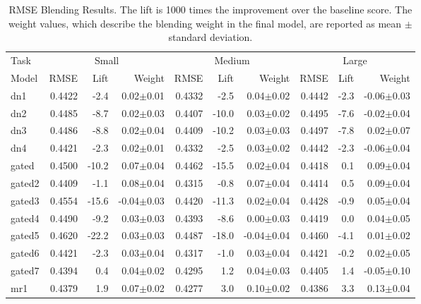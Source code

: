 \documentclass{article}
\begin{document}
\begin{table}[b]
\caption{RMSE Blending Results.  The lift is 1000 times the improvement over the baseline score.  The weight values, which describe the blending weight in the final model, are reported as mean $\pm$ standard deviation.}
\label{table:rmse-results}
\vskip 0.15in
\begin{center}
\begin{small}
\begin{sc}
\begin{tabular}{l|rr r|rr r|rr r}
\hline
\abovespace\belowspace
Task & \multicolumn{3}{|c}{Small} & \multicolumn{3}{|c}{Medium} & \multicolumn{3}{|c}{Large} \\
Model
& RMSE & Lift & Weight 
& RMSE & Lift & Weight 
& RMSE & Lift & Weight \\
\hline
\abovespace
dn1        & 0.4422 &  -2.4 &  0.02$\pm$0.01& 0.4332 &  -2.5 &  0.04$\pm$0.02& 0.4442 &  -2.3 & -0.06$\pm$0.03 \\ 
dn2        & 0.4485 &  -8.7 &  0.02$\pm$0.03& 0.4407 & -10.0 &  0.03$\pm$0.02& 0.4495 &  -7.6 & -0.02$\pm$0.04 \\ 
dn3        & 0.4486 &  -8.8 &  0.02$\pm$0.04& 0.4409 & -10.2 &  0.03$\pm$0.03& 0.4497 &  -7.8 &  0.02$\pm$0.07 \\ 
dn4        & 0.4421 &  -2.3 &  0.02$\pm$0.01& 0.4332 &  -2.5 &  0.03$\pm$0.02& 0.4442 &  -2.3 & -0.06$\pm$0.04 \\ 
\abovespace
gated      & 0.4500 & -10.2 &  0.07$\pm$0.04& 0.4462 & -15.5 &  0.02$\pm$0.04& 0.4418 &   0.1 &  0.09$\pm$0.04 \\ 
gated2     & 0.4409 &  -1.1 &  0.08$\pm$0.04& 0.4315 &  -0.8 &  0.07$\pm$0.04& 0.4414 &   0.5 &  0.09$\pm$0.04 \\ 
gated3     & 0.4554 & -15.6 & -0.04$\pm$0.03& 0.4420 & -11.3 &  0.02$\pm$0.04& 0.4428 &  -0.9 &  0.05$\pm$0.04 \\ 
gated4     & 0.4490 &  -9.2 &  0.03$\pm$0.03& 0.4393 &  -8.6 &  0.00$\pm$0.03& 0.4419 &   0.0 &  0.04$\pm$0.05 \\ 
gated5     & 0.4620 & -22.2 &  0.03$\pm$0.03& 0.4487 & -18.0 & -0.04$\pm$0.04& 0.4460 &  -4.1 &  0.01$\pm$0.02 \\ 
gated6     & 0.4421 &  -2.3 &  0.03$\pm$0.04& 0.4317 &  -1.0 &  0.03$\pm$0.04& 0.4421 &  -0.2 &  0.02$\pm$0.05 \\ 
gated7     & 0.4394 &   0.4 &  0.04$\pm$0.02& 0.4295 &   1.2 &  0.04$\pm$0.03& 0.4405 &   1.4 & -0.05$\pm$0.10 \\ 
\abovespace
mr1        & 0.4379 &   1.9 &  0.07$\pm$0.02& 0.4277 &   3.0 &  0.10$\pm$0.02& 0.4386 &   3.3 &  0.13$\pm$0.04 \\ 

\end{tabular}
\end{sc}
\end{small}
\end{center}
\end{table}
\end{document}
